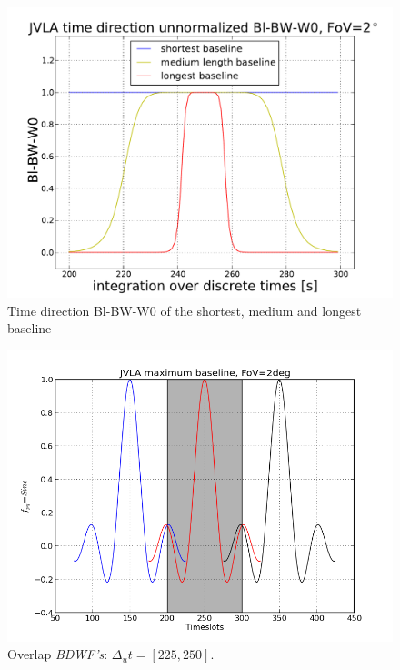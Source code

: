 \documentclass[useAMS,usenatbib]{mn2e}
\begin{document}
\begin{figure}
  \begin{minipage}{0.38\linewidth}\includegraphics[width=1\textwidth]{./Figures/longshortmid-butter.pdf}\\
  \caption{Time direction Bl-BW-W0 of the shortest, medium and longest baseline}\label{fig:longshortmid-butter}
  \end{minipage}
  \hspace{1cm}
\begin{minipage}{0.38\linewidth}\includegraphics[width=1\textwidth]{./Figures/corrSigVLAMxBl_overlapLdelta.png}\caption{Overlap 
		\textit{BDWF's}: $\Delta_u t= [225, 250]$.}\label{fig:corrSigVLAMxBl_overlapLdelta}\end{minipage}

\end{figure}
\end{document}
